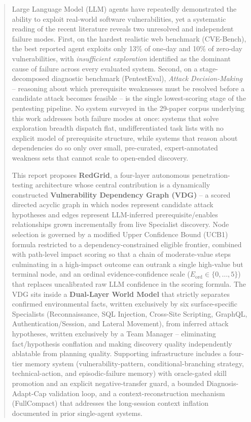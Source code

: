 

\begin{abstract}

\hspace{1cm} Large Language Model (LLM) agents have repeatedly demonstrated the ability to exploit real-world software vulnerabilities, yet a systematic reading of the recent literature reveals two unresolved and independent failure modes. First, on the hardest realistic web benchmark (CVE-Bench), the best reported agent exploits only 13\% of one-day and 10\% of zero-day vulnerabilities, with \emph{insufficient exploration} identified as the dominant cause of failure across every evaluated system. Second, on a stage-decomposed diagnostic benchmark (PentestEval), \emph{Attack Decision-Making} -- reasoning about which prerequisite weaknesses must be resolved before a candidate attack becomes feasible -- is the single lowest-scoring stage of the pentesting pipeline. No system surveyed in the 29-paper corpus underlying this work addresses both failure modes at once: systems that solve exploration breadth dispatch flat, undifferentiated task lists with no explicit model of prerequisite structure, while systems that reason about dependencies do so only over small, pre-curated, expert-annotated weakness sets that cannot scale to open-ended discovery.

\vspace{0.3cm}
\hspace{1cm} This report proposes \textbf{RedGrid}, a four-layer autonomous penetration-testing architecture whose central contribution is a dynamically constructed \textbf{Vulnerability Dependency Graph (VDG)} -- a scored directed acyclic graph in which nodes represent candidate attack hypotheses and edges represent LLM-inferred prerequisite/enables relationships grown incrementally from live Specialist discovery. Node selection is governed by a modified Upper Confidence Bound (UCB1) formula restricted to a dependency-constrained eligible frontier, combined with path-level impact scoring so that a chain of moderate-value steps culminating in a high-impact outcome can outrank a single high-value but terminal node, and an ordinal evidence-confidence scale ($E_{\mathrm{ord}} \in \{0,\ldots,5\}$) that replaces uncalibrated raw LLM confidence in the scoring formula. The VDG sits inside a \textbf{Dual-Layer World Model} that strictly separates confirmed environmental facts, written exclusively by six surface-specific Specialists (Reconnaissance, SQL Injection, Cross-Site Scripting, GraphQL, Authentication/Session, and Lateral Movement), from inferred attack hypotheses, written exclusively by a Team Manager -- eliminating fact/hypothesis conflation and making discovery quality independently ablatable from planning quality. Supporting infrastructure includes a four-tier memory system (vulnerability-pattern, conditional-branching strategy, technical-action, and episodic-failure memory) with oracle-gated skill promotion and an explicit negative-transfer guard, a bounded Diagnosis-Adapt-Cap validation loop, and a context-reconstruction mechanism (FullCompact) that addresses the long-session context inflation documented in prior single-agent systems.


\end{abstract}
